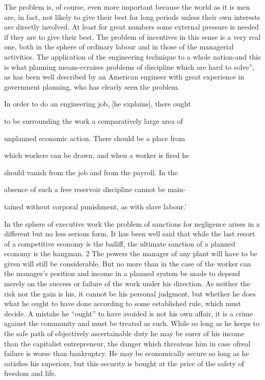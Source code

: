 \documentclass[11pt,openany]{book}
\begin{document}
The problem is, of course, even more important because the world as it is men are, in fact, not likely to give their best for long periods unless their own interests are directly involved. At least for great numbers some external pressure is needed if they are to give their best. The problem of incentives in this sense is a very real one, both in the sphere of ordinary labour and in those of the managerial activities. The application of the engineering technique to a whole nation-and this is what planning means-ccraises problems of discipline which are hard to solve'', as has been well described by an American engineer with great experience in government planning, who has clearly seen the problem.

In order to do an engineering job, [he explains], there ought

to be surrounding the work a comparatively large area of

unplanned economic action. There should be a place from

which workers can be drawn, and when a worker is fired he

should vanish from the job and from the payroll. In the

absence of such a free reservoir discipline cannot be main-

tained without corporal punishment, as with slave labour.'

In the sphere of executive work the problem of sanctions for negligence arises in a different but no less serious form. It has been well said that while the last resort of a competitive economy is the bailiff, the ultimate sanction of a planned economy is the hangman. 2 The powers the manager of any plant will have to be given will still be considerable. But no more than in the case of the worker can the manager's position and income in a planned system be made to depend merely on the success or failure of the work under his direction. As neither the risk nor the gain is his, it cannot be his personal judgment, but whether he does what he ought to have done according to some established rule, which must decide. A mistake he ``ought'' to have avoided is not his own affair, it is a crime against the community and must be treated as such. While so long as he keeps to the safe path of objectively ascertainable duty he may be surer of his income than the capitalist entrepreneur, the danger which threatens him in case ofreal failure is worse than bankruptcy. He may be economically secure so long as he satisfies his superiors, but this security is bought at the price of the safety of freedom and life.
\end{document}
